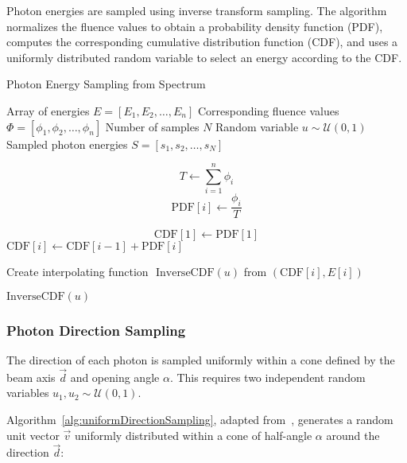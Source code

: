 Photon energies are sampled using inverse transform sampling. The algorithm
normalizes the fluence values to obtain a probability density function (PDF),
computes the corresponding cumulative distribution function (CDF), and uses a
uniformly distributed random variable to select an energy according to the CDF.

\begin{algorithm}[H]
\caption{Photon Energy Sampling from Spectrum}
\label{alg:photonEnergySampling}
\begin{algorithmic}[1]
\Require Array of energies $E = [E_1, E_2, \dots, E_n]$ 
\Require Corresponding fluence values $\Phi = [\phi_1, \phi_2, \dots, \phi_n]$ 
\Require Number of samples $N$ 
\Require Random variable $u \sim \mathcal{U}(0, 1)$ \Ensure Sampled photon
energies $S = [s_1, s_2, \dots, s_N]$

 \State $$T \gets \sum_{i=1}^{n} \phi_i$$
\State $$\text{PDF}[i] \gets \frac{\phi_i}{T}$$

\State $$\text{CDF}[1] \gets \text{PDF}[1]$$ 
\State $\text{CDF}[i] \gets \text{CDF}[i-1] + \text{PDF}[i]$ 
\EndFor


\State Create interpolating function $\text{ InverseCDF}(u)$ from
$(\text{CDF}[i], E[i])$

\State \Return $\text{InverseCDF}(u)$

\end{algorithmic}
\end{algorithm}

\subsubsection{Photon Direction Sampling}

The direction of each photon is sampled uniformly within a cone defined by the
beam axis $\vec{d}$ and opening angle $\alpha$. This requires two independent
random variables $u_1, u_2 \sim \mathcal{U}(0, 1)$.

Algorithm~\ref{alg:uniformDirectionSampling}, adapted
from~\cite{venkatapathi2021n}, generates a random unit vector $\vec{v}$
uniformly distributed within a cone of half-angle $\alpha$ around the direction
$\vec{d}$:

